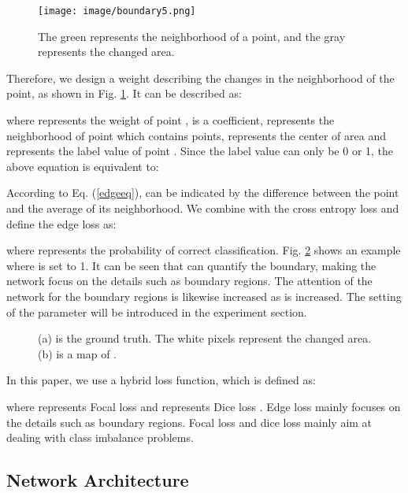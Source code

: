 \documentclass[lettersize,journal]{IEEEtran}
\begin{document}
\begin{figure}[ht]
\centering
\texttt{[image: image/boundary5.png]}
\caption{The green represents the neighborhood of a point, and the gray represents the changed area.}
\label{boundary5}
\end{figure}

Therefore, we design a weight  describing the changes in the neighborhood of the point, as shown in Fig. \ref{boundary5}.
It can be described as:

where  represents the weight of point ,  is a coefficient,  represents the neighborhood of point  which contains  points,  represents the center of area  and  represents the label value of point .
Since the label value can only be 0 or 1, the above equation is equivalent to:

According to Eq. (\ref{edgeeq}),  can be indicated by the difference between the point and the average of its neighborhood.
We combine  with the cross entropy loss and define the edge loss as:

where  represents the probability of correct classification.
Fig. \ref{edgeloss} shows an example where  is set to 1.
It can be seen that  can quantify the boundary, making the network focus on the details such as boundary regions.
The attention of the network for the boundary regions is likewise increased as  is increased.
The setting of the parameter  will be introduced in the experiment section.




\begin{figure}[ht]
\centering
{}
\caption{(a) is the ground truth. 
The white pixels represent the changed area.
(b) is a map of .}
\label{edgeloss}
\end{figure}

In this paper, we use a hybrid loss function, which is defined as:



where  represents Focal loss \cite{lin2017focal} and  represents Dice loss \cite{milletari2016v}.
Edge loss mainly focuses on the details such as boundary regions.
Focal loss and dice loss mainly aim at dealing with class imbalance problems.


\subsection{Network Architecture}
\end{document}
